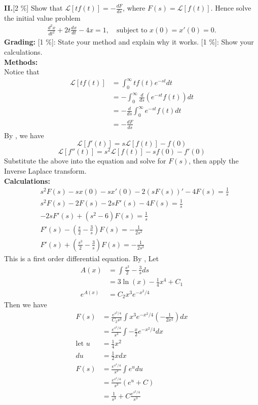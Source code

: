 \documentclass[A4paper,12pt]{article}
\theoremstyle{definition}
\numberwithin{equation}{section}
\begin{document}
\textbf{II.}[2 \%] Show that \(\mathcal{L}[tf(t)]=-\frac{dF}{ds}\),
where \(F(s)=\mathcal{L}[f(t)]\). Hence solve the initial value
problem
\begin{align*}
\frac{d^2x}{dt^2}+2t\frac{dx}{dt}-4x=1, \quad \text{subject
to }x(0)=x'(0)=0.
\end{align*}
\textbf{Grading:}
[1 \%]: State your method and explain why it works.
[1 \%]: Show your calculations.
\vspace{20pt}
\\
\textbf{Methods: }\\
Notice that 
\begin{align*}
    \mathcal{L}[tf(t)] &= \int_0^\infty tf(t) e^{-st}dt \\
                       &= -\int_0^\infty \frac{d}{ds}(e^{-st}f(t))dt \\
                       &= -\frac{d}{ds} \int_0^\infty e^{-st}f(t)dt \\
                       &= -\frac{dF}{ds}
\end{align*}
By \cite{textbook}, we have 
$$\mathcal{L}[f'(t)] = s\mathcal{L}[f(t)] - f(0)$$
$$\mathcal{L}[f''(t)] = s^2\mathcal{L}[f(t)] - sf(0) - f'(0)$$
Substitute the above into the equation and solve for $F(s)$, then apply the Inverse Laplace transform.
\\
\textbf{Calculations: }\\
\begin{align*}
& s^2 F(s) - s x(0) - s x'(0) - 2 ( s F(s))' - 4 F(s) = \frac{1}{s} \\
& s^2 F(s) - 2 F(s) - 2 s F'(s) - 4 F(s) = \frac{1}{s} \\
& -2 s F'(s) + (s^2 - 6)F(s) = \frac{1}{s} \\
& F'(s) - ( \frac{s}{2} - \frac{3}{s} ) F(s) = -\frac{1}{2 s^2} \\
& F'(s) + ( \frac{s^3}{2} - \frac{3}{s} ) F(s) = -\frac{1}{2s^2}
\end{align*}
This is a first order differential equation. By \cite{textcal},
Let 
\begin{align*}
    A(x) &= \int \frac{s^3}{2} - \frac{3}{s}  ds \\
         &= 3 \ln(x) - \frac{1}{4} x^4 + C_1\\
    e^{A(x)} &= C_2 x^3 e^{-x^2/4}
\end{align*}
Then we have 
\begin{align*}
F(s) &= \frac{e^{s^2/4}}{C_2 s^3} \int x^3 e^{-x^2/4} ( -\frac{1}{2x^2}) dx\\
     &= \frac{e^{s^2/4}}{s^3} \int -\frac{x}{2} e^{-x^2/4} dx \\
\text{let }u &= \frac{1}{4} x^2 \\
du &= \frac{1}{2} x dx \\
F(s) &= \frac{e^{s^4/4}}{s^3} \int e^{u} du \\
&= \frac{e^{s^4/4}}{s^3} ( e^{u} + C ) \\
&= \frac{1}{s^3} + C \frac{e^{s^2/4}}{s^3}
\end{align*}
\end{document}
